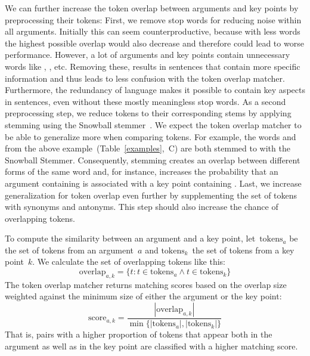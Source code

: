 We can further increase the token overlap between arguments and key points by preprocessing their tokens:
First, we remove stop words for reducing noise within all arguments.
Initially this can seem counterproductive, because with less words the highest possible overlap would also decrease and 
therefore could lead to worse performance.
However, a lot of arguments and key points contain unnecessary words like , ,  etc.
Removing these, results in sentences that contain more specific information and thus leads to less confusion with the token overlap matcher.
Furthermore, the redundancy of language makes it possible to contain key aspects in sentences, even without these mostly meaningless stop words.
As a second preprocessing step, we reduce tokens to their corresponding stems by applying stemming using the Snowball stemmer~\cite{Porter1980}. 
We expect the token overlap matcher to be able to generalize more when comparing tokens.
For example, the words  and  from the above example~(Table~\ref{examples},~C) 
are both stemmed to  with the Snowball Stemmer. 
Consequently, stemming creates an overlap between different forms of the same word and, for instance, increases the 
probability that an argument containing  is associated with a key point containing .
Last, we increase generalization for token overlap even further by supplementing the set of tokens with synonyms and antonyms. 
This step should also increase the chance of overlapping tokens.

To compute the similarity between an argument and a key point, let~\(\text{tokens}_a\) be the set of tokens from an 
argument~\(a\) and \(\text{tokens}_k\)~the set of tokens from a key point~\(k\).
We calculate the set of overlapping tokens like this:
\begin{equation}
    \text{overlap}_{a,k} = \{ t : t \in \text{tokens}_a \land t \in \text{tokens}_k \}
\end{equation}
The token overlap matcher returns matching scores based on the overlap size weighted against the minimum size of either 
the argument or the key point:
\begin{equation}
    \text{score}_{a,k} = \frac{ |\text{overlap}_{a,k}| }{ \min\{ |\text{tokens}_a|, |\text{tokens}_k| \} }
\end{equation}
That is, pairs with a higher proportion of tokens that appear both in the argument as well as in the key point are 
classified with a higher matching score.

